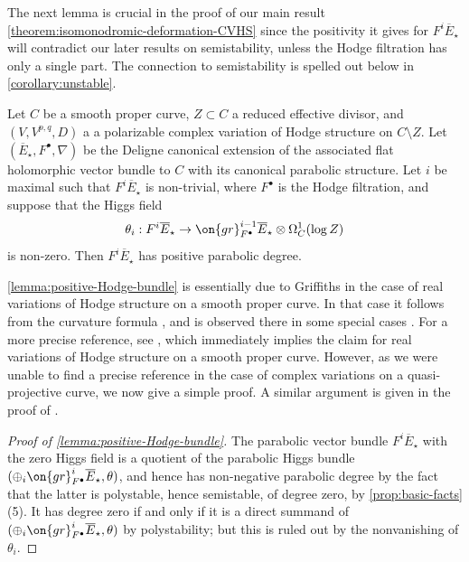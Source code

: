 The next lemma is crucial in the proof of our main result
\autoref{theorem:isomonodromic-deformation-CVHS} since the positivity it
gives for $F^i \overline{E}_\star$ will contradict our later results on
semistability, unless the Hodge filtration has only a single part.
The connection to semistability is spelled out below in
\autoref{corollary:unstable}.
\begin{lemma}
\notready\label{lemma:positive-Hodge-bundle}
    Let $C$ be a smooth proper curve, $Z\subset C$ a reduced effective divisor,
    and $(V, V^{p,q}, D)$ a  a polarizable complex variation of Hodge structure
    on $C\setminus Z$. Let $(\overline{E}_\star, F^\bullet, \nabla)$ be the Deligne canonical
    extension of the associated flat holomorphic vector bundle to $C$ with its
    canonical parabolic structure.  Let $i$ be maximal such that
    $F^i\overline{E}_\star$ is non-trivial, where $F^\bullet$ is the Hodge
    filtration, and suppose that the Higgs field $$\theta_i:
    F^i\overline{E}_\star\to
    \on{gr}^{i-1}_{F^{\bullet}}\overline{E}_\star\otimes \Omega^1_C(\log Z)$$ is
    non-zero. Then $F^i\overline{E}_\star$ has positive parabolic degree.
\end{lemma}
\begin{remark}
\notready
	\label{remark:}
	\autoref{lemma:positive-Hodge-bundle} is essentially due to Griffiths in the case of real variations of
	Hodge structure on a
	smooth proper curve. In that case it follows from the curvature formula \cite[Theorem
	5.2]{griffiths1970periods}, and is observed there in some special cases
	\cite[Corollary 7.10]{griffiths1970periods}. For a more precise
	reference, see \cite[Corollary 2.2]{peters2000arakelov}, which
	immediately implies the claim for real variations of Hodge structure on a smooth proper curve.
	However, as we were unable to find a precise reference in the case of complex
	variations on a quasi-projective curve, we now give a simple proof.
	A similar argument is given in the proof of
	\cite[Theorem 3.8]{esnaultK:d-modules-and-finite-monodromy}.
\end{remark}
\begin{proof}[Proof of \autoref{lemma:positive-Hodge-bundle}]
The parabolic vector bundle $F^i\overline{E}_\star$ with the zero Higgs field is a quotient of
the parabolic Higgs bundle  $(\oplus_i \on{gr}^i_{F^\bullet}\overline{E}_\star, \theta)$, and
hence has non-negative parabolic degree by the fact that the latter is polystable, hence semistable, of
degree zero, by \autoref{prop:basic-facts}(5). It has degree zero if and only if
it is a direct summand of $(\oplus_i \on{gr}^i_{F^\bullet}\overline{E}_\star, \theta)$ by polystability; but this is ruled out by the nonvanishing of $\theta_i$.
\end{proof}
